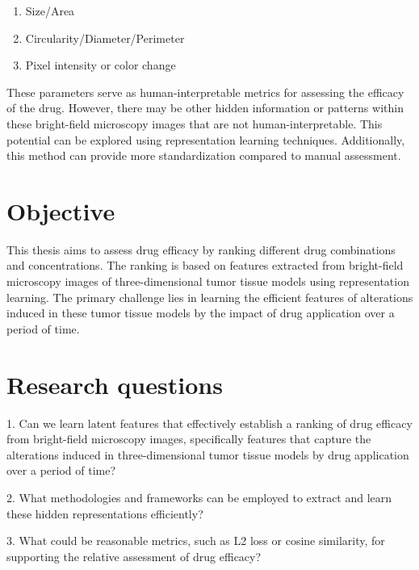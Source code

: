 \documentclass[12pt,twoside,a4paper,parskip]{scrbook} %
\begin{document}
\begin{enumerate}
  \item Size/Area
  \item Circularity/Diameter/Perimeter
  \item Pixel intensity or color change
\end{enumerate}

These parameters serve as human-interpretable metrics for assessing the efficacy of the drug. However, there may be other hidden information or patterns within these bright-field microscopy images that are not human-interpretable. This potential can be explored using representation learning techniques. Additionally, this method can provide more standardization compared to manual assessment.
\let\cleardoublepage\clearpage
\chapter{Objective}\label{ch:Objective}
This thesis aims to assess drug efficacy by ranking different drug combinations and concentrations. The ranking is based on features extracted from bright-field microscopy images of  three-dimensional tumor tissue models using representation learning. The primary challenge lies in learning the efficient features of alterations induced in these tumor tissue models by the impact of drug application over a period of time.
\let\cleardoublepage\clearpage
\chapter{Research questions}\label{ch:Research questions}

1. Can we learn latent features that effectively establish a ranking of drug efficacy from bright-field microscopy images, specifically features that capture the alterations induced in three-dimensional tumor tissue models by drug application over a period of time?

2. What methodologies and frameworks can be employed to extract and learn these hidden representations efficiently?

3. What could be reasonable metrics, such as L2 loss or cosine similarity, for supporting the relative assessment of drug efficacy?
\end{document}
